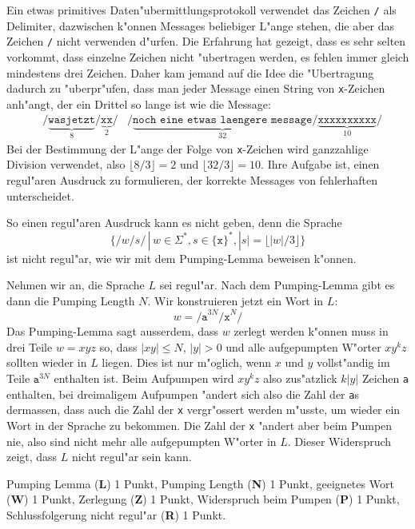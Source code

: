 Ein etwas primitives Daten"ubermittlungsprotokoll verwendet
das Zeichen \texttt{/} als Delimiter, dazwischen k"onnen Messages beliebiger
L"ange stehen, die aber das Zeichen \texttt{/} nicht verwenden d"urfen.
Die Erfahrung hat gezeigt, dass es sehr selten vorkommt, dass einzelne
Zeichen nicht "ubertragen werden, es fehlen immer gleich mindestens drei
Zeichen. Daher kam jemand auf die Idee die "Ubertragung dadurch zu "uberpr"ufen,
dass man jeder Message einen String von \texttt{x}-Zeichen anh"angt, der
ein Drittel so lange ist wie die Message:
\begin{align*}
&\texttt{/}\underbrace{\texttt{wasjetzt}}_8\texttt{/}\underbrace{\texttt{xx}}_2\texttt{/}
&\texttt{/}\underbrace{\texttt{noch eine etwas laengere message}}_{32}\texttt{/}\underbrace{\texttt{xxxxxxxxxx}}_{10}\texttt{/}
\end{align*}
Bei der Bestimmung der L"ange der Folge von \texttt{x}-Zeichen wird ganzzahlige
Division verwendet, also $\lfloor 8 / 3\rfloor = 2$ und $\lfloor 32 / 3 \rfloor = 10$.
Ihre Aufgabe ist, einen regul"aren Ausdruck zu formulieren, der korrekte
Messages von fehlerhaften unterscheidet.

\begin{loesung}
So einen regul"aren Ausdruck kann es nicht geben, denn die Sprache 
\[
\{ \texttt{/}w\texttt{/}s\texttt{/}\, |\, w\in \Sigma^*, s\in\{\texttt{x}\}^*,
|s| = \lfloor |w|/3\rfloor
\}
\]
ist nicht regul"ar, wie wir mit dem Pumping-Lemma beweisen k"onnen.

Nehmen wir an, die Sprache $L$ sei regul"ar. Nach dem Pumping-Lemma gibt
es dann die Pumping Length $N$. Wir konstruieren jetzt ein Wort in $L$:
\[
w=
\texttt{/a}^{3N}\texttt{/x}^N\texttt{/}
\]
Das Pumping-Lemma sagt ausserdem, dass $w$ zerlegt werden k"onnen muss in
drei Teile $w=xyz$ so, dass $|xy|\le N$, $|y|>0$ und alle aufgepumpten
W"orter $xy^kz$ sollten wieder in $L$ liegen. Dies ist nur m"oglich,
wenn $x$ und $y$ vollst"andig im Teile $\texttt{a}^{3N}$ enthalten ist.
Beim Aufpumpen wird $xy^kz$ also zus"atzlick $k|y|$ Zeichen \texttt{a}
enthalten, bei dreimaligem Aufpumpen "andert sich also die Zahl der 
\texttt{a}s dermassen, dass auch die Zahl der \texttt{x} vergr"ossert
werden m"usste, um wieder ein Wort in der Sprache zu bekommen. Die Zahl
der \texttt{x} "andert aber beim Pumpen nie, also sind nicht mehr alle
aufgepumpten W"orter in $L$. Dieser Widerspruch zeigt, dass $L$ nicht
regul"ar sein kann.
\end{loesung}

\begin{bewertung}
Pumping Lemma (\textbf{L}) 1 Punkt, Pumping Length (\textbf{N}) 1 Punkt,
geeignetes Wort (\textbf{W}) 1 Punkt, Zerlegung (\textbf{Z}) 1 Punkt,
Widerspruch beim Pumpen (\textbf{P}) 1 Punkt,
Schlussfolgerung nicht regul"ar (\textbf{R}) 1 Punkt.
\end{bewertung}
